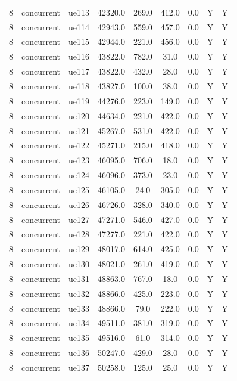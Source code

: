 \begin{table}[ht]
\begin{tabular}{|c|c|c|c|c|c|c|c|c|}
8 & concurrent & ue113 & 42320.0 & 269.0 & 412.0 & 0.0 & Y & Y \\
8 & concurrent & ue114 & 42943.0 & 559.0 & 457.0 & 0.0 & Y & Y \\
8 & concurrent & ue115 & 42944.0 & 221.0 & 456.0 & 0.0 & Y & Y \\
8 & concurrent & ue116 & 43822.0 & 782.0 & 31.0 & 0.0 & Y & Y \\
8 & concurrent & ue117 & 43822.0 & 432.0 & 28.0 & 0.0 & Y & Y \\
8 & concurrent & ue118 & 43827.0 & 100.0 & 38.0 & 0.0 & Y & Y \\
8 & concurrent & ue119 & 44276.0 & 223.0 & 149.0 & 0.0 & Y & Y \\
8 & concurrent & ue120 & 44634.0 & 221.0 & 422.0 & 0.0 & Y & Y \\
8 & concurrent & ue121 & 45267.0 & 531.0 & 422.0 & 0.0 & Y & Y \\
8 & concurrent & ue122 & 45271.0 & 215.0 & 418.0 & 0.0 & Y & Y \\
8 & concurrent & ue123 & 46095.0 & 706.0 & 18.0 & 0.0 & Y & Y \\
8 & concurrent & ue124 & 46096.0 & 373.0 & 23.0 & 0.0 & Y & Y \\
8 & concurrent & ue125 & 46105.0 & 24.0 & 305.0 & 0.0 & Y & Y \\
8 & concurrent & ue126 & 46726.0 & 328.0 & 340.0 & 0.0 & Y & Y \\
8 & concurrent & ue127 & 47271.0 & 546.0 & 427.0 & 0.0 & Y & Y \\
8 & concurrent & ue128 & 47277.0 & 221.0 & 422.0 & 0.0 & Y & Y \\
8 & concurrent & ue129 & 48017.0 & 614.0 & 425.0 & 0.0 & Y & Y \\
8 & concurrent & ue130 & 48021.0 & 261.0 & 419.0 & 0.0 & Y & Y \\
8 & concurrent & ue131 & 48863.0 & 767.0 & 18.0 & 0.0 & Y & Y \\
8 & concurrent & ue132 & 48866.0 & 425.0 & 223.0 & 0.0 & Y & Y \\
8 & concurrent & ue133 & 48866.0 & 79.0 & 222.0 & 0.0 & Y & Y \\
8 & concurrent & ue134 & 49511.0 & 381.0 & 319.0 & 0.0 & Y & Y \\
8 & concurrent & ue135 & 49516.0 & 61.0 & 314.0 & 0.0 & Y & Y \\
8 & concurrent & ue136 & 50247.0 & 429.0 & 28.0 & 0.0 & Y & Y \\
8 & concurrent & ue137 & 50258.0 & 125.0 & 25.0 & 0.0 & Y & Y \\

\end{tabular}
\end{table}
